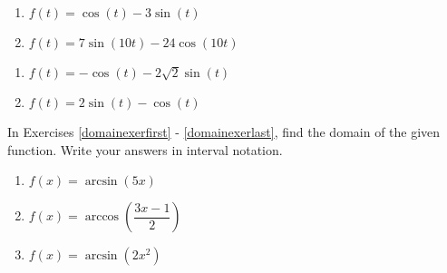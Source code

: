 \begin{multicols}{2}

\begin{enumerate}

\setcounter{enumi}{\value{HW}}

\item $f(t) = \cos(t) - 3\sin(t)$
\item $f(t) = 7\sin(10t) - 24\cos(10t)$

\setcounter{HW}{\value{enumi}}

\end{enumerate}

\end{multicols}

\begin{multicols}{2}

\begin{enumerate}

\setcounter{enumi}{\value{HW}}

\item $f(t) = -\cos(t) - 2\sqrt{2} \sin(t)$
\item $f(t) = 2\sin(t) - \cos(t)$ \label{rewritesinusoidlast}

\setcounter{HW}{\value{enumi}}

\end{enumerate}

\end{multicols}

In Exercises \ref{domainexerfirst} - \ref{domainexerlast}, find the domain of the given function.  Write your answers in interval notation.

\begin{multicols}{3}

\begin{enumerate}

\setcounter{enumi}{\value{HW}}

\item  $f(x) = \arcsin(5x)$  \label{domainexerfirst}
\item  $f(x) = \arccos\left(\dfrac{3x-1}{2} \right)$
\item  $f(x) = \arcsin\left(2x^2\right)$ 

\setcounter{HW}{\value{enumi}}

\end{enumerate}

\end{multicols}

